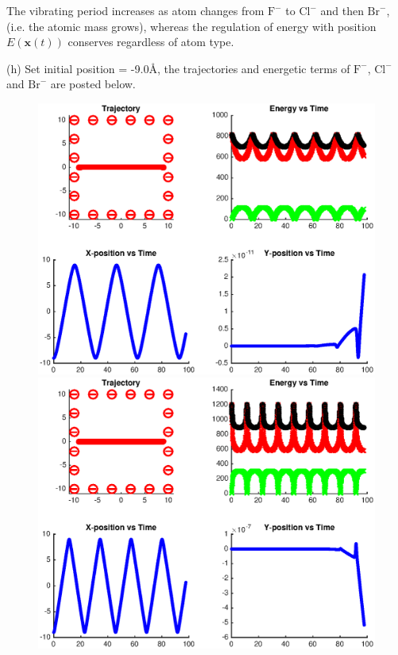 \documentclass{article}
\begin{document}
The vibrating period increases as atom changes from $\text{F}^{-}$ to $\text{Cl}^{-}$ and then $\text{Br}^{-}$, (i.e. the atomic mass grows), whereas the regulation of energy with position $E(\mathbf{x}(t))$ conserves regardless of atom type.

\vspace{1mm}
\noindent
(h) Set initial position = -9.0\r{A}, the trajectories and energetic terms of $\text{F}^{-}$, $\text{Cl}^{-}$ and $\text{Br}^{-}$ are posted below.

\vspace{-0.5cm}
\begin{figure}[h]
    \centering
    \includegraphics[scale=0.6]{8}
    \includegraphics[scale=0.6]{9}
\end{figure}
\end{document}
